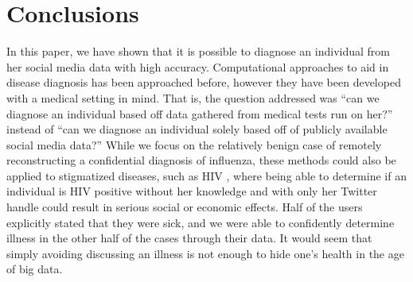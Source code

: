 \section{Conclusions}


In this paper, we have shown that it is possible to diagnose an individual from her social media data with high accuracy. Computational approaches to aid in disease diagnosis has been approached before, however they have been developed with a medical setting in mind. That is, the question addressed was ``can we diagnose an individual based off data gathered from medical tests run on her?'' instead of ``can we diagnose an individual solely based off of publicly available social media data?''  While we focus on the relatively benign case of remotely reconstructing a confidential diagnosis of influenza, these methods could also be applied to stigmatized diseases, such as HIV \cite{cosme2015}, where being able to determine if an individual is HIV positive without her knowledge and with only her Twitter handle could result in serious social or economic effects. Half of the users explicitly stated that they were sick, and we were able to confidently determine illness in the other half of the cases through their data. It would seem that simply avoiding discussing an illness is not enough to hide one's health in the age of big data. 

